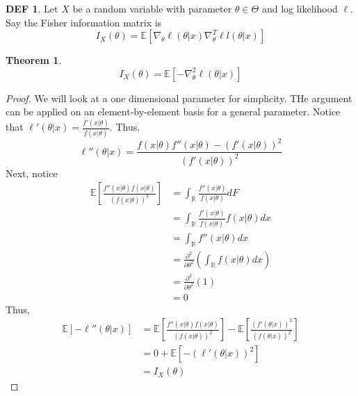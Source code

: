 \documentclass{article}
\newtheorem{theorem}{Theorem}
\theoremstyle{definition}\newtheorem{definition}{DEF}
\theoremstyle{definition}\newtheorem{example}{Ex}
\theoremstyle{lemma}\newtheorem{lemma}{Lemma}
\theoremstyle{corrolary}\newtheorem{corrolary}{Cor}
\begin{document}
\begin{definition}
Let $X$ be a random variable with parameter $\theta \in \Theta$  and log likelihood $\ell$.
Say the Fisher information matrix is
\begin{equation}
I_X(\theta) = \mathbb{E}\left[ \nabla_\theta \ell(\theta | x) \nabla_\theta^T \ell l(\theta | x) \right]
\end{equation}
\end{definition}

\begin{theorem}
\begin{equation}
I_X(\theta) = \mathbb{E}\left[ -\nabla_\theta^2 \ell(\theta | x)\right]
\end{equation}
\end{theorem}
\begin{proof}
We will look at a one dimensional parameter for simplicity.
THe argument can be applied on an element-by-element basis for a general parameter.
Notice that $\ell'(\theta | x) = \frac{f'(x|\theta)}{f(x|\theta)}$.
Thus,
\begin{equation*}
\ell''(\theta|x) = \frac{f(x|\theta)f''(x|\theta) - (f'(x|\theta))^2}{(f'(x|\theta))^2}
\end{equation*}
Next, notice
\begin{align*}
\mathbb{E}\left[ \frac{f''(x|\theta)f(x|\theta)}{(f(x|\theta))^2}\right]
&= \int_\mathbb{R} \frac{f''(x|\theta)}{f(x|\theta)} dF \\
&= \int_\mathbb{R} \frac{f'(x|\theta)}{f(x|\theta)} f(x|\theta) dx \\
&= \int_\mathbb{R} f''(x|\theta) dx \\
&= \frac{\partial^2}{\partial \theta^2} \left( \int_\mathbb{R} f(x|\theta)dx \right) \\
&= \frac{\partial^2}{\partial \theta^2}\left( 1 \right) \\
&= 0
\end{align*}
Thus,
\begin{align*}
\mathbb{E}\left[ -\ell''(\theta|x)\right]
&= \mathbb{E}\left[ \frac{f''(x|\theta)f(x|\theta)}{(f(x|\theta))^2}\right] - \mathbb{E}\left[\frac{(f'(\theta|x))^2}{(f(\theta|x))^2} \right]\\
&= 0 + \mathbb{E}\left[ -(\ell'(\theta|x))^2\right] \\
&= I_X(\theta)
\end{align*}
\end{proof}
\end{document}
